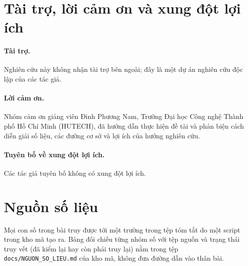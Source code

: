 \documentclass[a4paper,fleqn]{cas-dc}
\begin{document}
\section*{Tài trợ, lời cảm ơn và xung đột lợi ích}
\paragraph{Tài trợ.} Nghiên cứu này không nhận tài trợ bên ngoài; đây là một dự án nghiên cứu độc lập của các tác giả.
\paragraph{Lời cảm ơn.} Nhóm cảm ơn giảng viên Đinh Phương Nam, Trường Đại học Công nghệ Thành phố Hồ Chí Minh (HUTECH), đã hướng dẫn thực hiện đề tài và phản biện cách diễn giải số liệu, các đường cơ sở và lợi ích của hướng nghiên cứu.
\paragraph{Tuyên bố về xung đột lợi ích.} Các tác giả tuyên bố không có xung đột lợi ích.

\appendix
\section{Nguồn số liệu}
\label{app:src}
Mọi con số trong bài truy được tới một trường trong tệp tóm tắt do một script trong kho mã tạo ra. Bảng đối chiếu từng nhóm số với tệp nguồn và trạng thái truy vết (đã kiểm lại hay còn phải truy lại) nằm trong tệp \texttt{docs/NGUON\_SO\_LIEU.md} của kho mã, không đưa đường dẫn vào thân bài.



\end{document}
